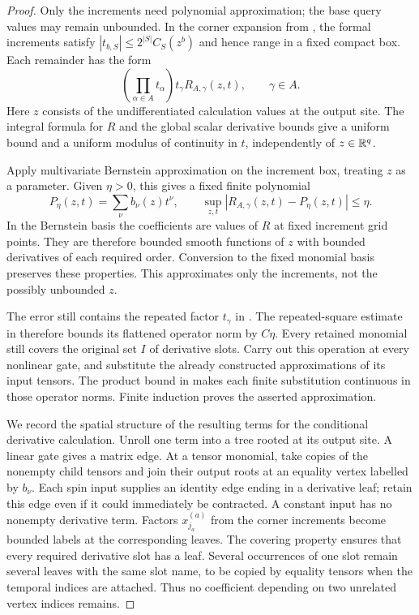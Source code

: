 \begin{proof}
Only the increments need polynomial approximation; the base query
values may remain unbounded.  In the corner expansion from
, the formal increments satisfy
$|t_{b,S}|\le 2^{|S|}C_S(z^b)$ and hence range in a fixed compact
box.  Each remainder has the form
\begin{equation}
 \left(\prod_{\alpha\in A}t_\alpha\right)t_\gamma
                 R_{A,\gamma}(z,t),\qquad\gamma\in A.
 \label{eq:path-increment-remainder}
\end{equation}
Here $z$ consists of the undifferentiated calculation values at the
output site.  The integral formula for $R$ and the global scalar
derivative bounds give a uniform bound and a uniform modulus of
continuity in $t$, independently of $z\in\mathbb R^q$.

Apply multivariate Bernstein approximation on the increment box,
treating $z$ as a parameter.  Given $\eta>0$, this gives a fixed
finite polynomial
\[
 P_\eta(z,t)=\sum_\nu b_\nu(z)t^\nu,
 \qquad \sup_{z,t}|R_{A,\gamma}(z,t)-P_\eta(z,t)|\le\eta.
\]
In the Bernstein basis the coefficients are values of $R$ at fixed
increment grid points.  They are therefore bounded smooth functions
of $z$ with bounded derivatives of each required order.  Conversion
to the fixed monomial basis preserves these properties.  This
approximates only the increments, not the possibly unbounded $z$.

The error still contains the repeated factor $t_\gamma$ in
.  The repeated-square estimate
in  therefore bounds its flattened
operator norm by $C\eta$.  Every retained monomial still covers
the original set $I$ of derivative slots.  Carry out this operation
at every nonlinear gate, and substitute the already constructed
approximations of its input tensors.  The product bound in
 makes each finite substitution
continuous in those operator norms.  Finite induction proves the
asserted approximation.

We record the spatial structure of the resulting terms for the
conditional derivative calculation.  Unroll one term into a tree
rooted at its output site.  A linear gate gives a matrix edge.  At
a tensor monomial, take copies of the nonempty child tensors and
join their output roots at an equality vertex labelled by $b_\nu$.  Each spin input
supplies an identity edge ending in a derivative leaf; retain this
edge even if it could immediately be contracted.  A constant input
has no nonempty derivative term.  Factors
$x^{(a)}_{j_a}$ from the corner increments become bounded labels
at the corresponding leaves.  The covering property ensures that
every required derivative slot has a leaf.  Several occurrences of
one slot remain several leaves with the same slot name, to be copied
by equality tensors when the temporal indices are attached.  Thus no
coefficient depending on two unrelated vertex indices remains.
\end{proof}


